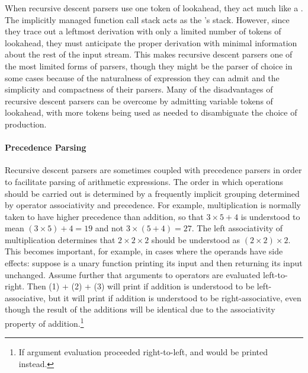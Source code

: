 When recursive descent parsers use one token of lookahead, they act much like a \PDA. The implicitly managed function call stack acts as the \PDA's stack. However, since they trace out a leftmost derivation with only a limited number of tokens of lookahead, they must anticipate the proper derivation with minimal information about the rest of the input stream. This makes recursive descent parsers one of the most limited forms of parsers, though they might be the parser of choice in some cases because of the naturalness of expression they can admit and the simplicity and compactness of their parsers. Many of the disadvantages of recursive descent parsers can be overcome by admitting variable tokens of lookahead, with more tokens being used as needed to disambiguate the choice of production.

\paragraph{Precedence Parsing}
Recursive descent parsers are sometimes coupled with precedence parsers in order to facilitate parsing of arithmetic expressions. The order in which operations should be carried out is determined by a frequently implicit grouping determined by operator associativity and precedence. For example, multiplication is normally taken to have higher precedence than addition, so that $3 \times 5 + 4$ is understood to mean $(3 \times 5) + 4 = 19$ and not $3 \times (5 + 4) = 27.$ The left associativity of multiplication determines that $2 \times 2 \times 2$ should be understood as $(2 \times 2) \times 2.$ This becomes important, for example, in cases where the operands have side effects: suppose  is a unary function printing its input and then returning its input unchanged. Assume further that arguments to operators are evaluated left-to-right. Then (1) + (2) + (3) will print  if addition is understood to be left-associative, but it will print  if addition is understood to be right-associative, even though the result of the additions will be identical due to the associativity property of addition.\footnote{If argument evaluation proceeded right-to-left,  and  would be printed instead.}

